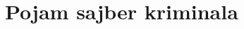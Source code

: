 \documentclass[a4paper]{article}
\newtheorem{primer}{Primer}[section]
\begin{document}
{%








\section{Pojam sajber kriminala}
\label{pojam}

}
\end{document}
